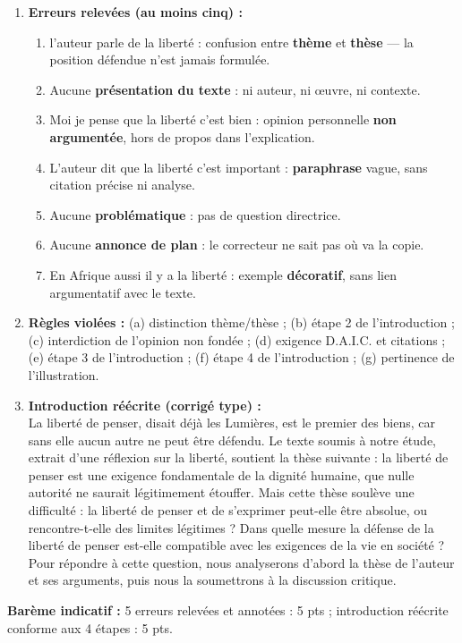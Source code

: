 \documentclass[11pt]{article}
\begin{document}
\begin{exoresolu}
\begin{enumerate}
\item \textbf{Erreurs relevées (au moins cinq) :}
\begin{enumerate}
\item \og l'auteur parle de la liberté \fg : confusion entre \textbf{thème} et \textbf{thèse} — la position défendue n'est jamais formulée.
\item Aucune \textbf{présentation du texte} : ni auteur, ni œuvre, ni contexte.
\item \og Moi je pense que la liberté c'est bien \fg : opinion personnelle \textbf{non argumentée}, hors de propos dans l'explication.
\item \og L'auteur dit que la liberté c'est important \fg : \textbf{paraphrase} vague, sans citation précise ni analyse.
\item Aucune \textbf{problématique} : pas de question directrice.
\item Aucune \textbf{annonce de plan} : le correcteur ne sait pas où va la copie.
\item \og En Afrique aussi il y a la liberté \fg : exemple \textbf{décoratif}, sans lien argumentatif avec le texte.
\end{enumerate}
\item \textbf{Règles violées :} (a) distinction thème/thèse ; (b) étape 2 de l'introduction ; (c) interdiction de l'opinion non fondée ; (d) exigence D.A.I.C. et citations ; (e) étape 3 de l'introduction ; (f) étape 4 de l'introduction ; (g) pertinence de l'illustration.
\item \textbf{Introduction réécrite (corrigé type) :}\\
\og La liberté de penser, disait déjà les Lumières, est le premier des biens, car sans elle aucun autre ne peut être défendu. Le texte soumis à notre étude, extrait d'une réflexion sur la liberté, soutient la thèse suivante : la liberté de penser est une exigence fondamentale de la dignité humaine, que nulle autorité ne saurait légitimement étouffer. Mais cette thèse soulève une difficulté : la liberté de penser et de s'exprimer peut-elle être absolue, ou rencontre-t-elle des limites légitimes ? Dans quelle mesure la défense de la liberté de penser est-elle compatible avec les exigences de la vie en société ? Pour répondre à cette question, nous analyserons d'abord la thèse de l'auteur et ses arguments, puis nous la soumettrons à la discussion critique. \fg
\end{enumerate}
\textbf{Barème indicatif :} 5 erreurs relevées et annotées : 5 pts ; introduction réécrite conforme aux 4 étapes : 5 pts.
\end{exoresolu}
\end{document}
